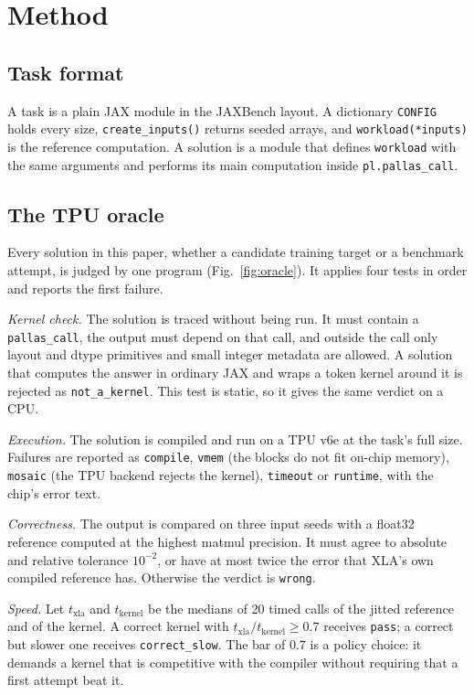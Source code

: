 \documentclass[conference]{IEEEtran}
\begin{document}
\section{Method}

\subsection{Task format}

A task is a plain JAX module in the JAXBench layout. A dictionary \texttt{CONFIG} holds every size, \texttt{create\_inputs()}
returns seeded arrays, and \texttt{workload(*inputs)} is the reference computation. A solution is a module that defines
\texttt{workload} with the same arguments and performs its main computation inside \texttt{pl.pallas\_call}.

\subsection{The TPU oracle}
\label{sec:oracle}

Every solution in this paper, whether a candidate training target or a benchmark attempt, is judged by one program
(Fig.~\ref{fig:oracle}). It applies four tests in order and reports the first failure.

\emph{Kernel check.} The solution is traced without being run. It must contain a \texttt{pallas\_call}, the output must depend
on that call, and outside the call only layout and dtype primitives and small integer metadata are allowed. A solution that
computes the answer in ordinary JAX and wraps a token kernel around it is rejected as \texttt{not\_a\_kernel}. This test is
static, so it gives the same verdict on a CPU.

\emph{Execution.} The solution is compiled and run on a TPU v6e at the task's full size. Failures are reported as
\texttt{compile}, \texttt{vmem} (the blocks do not fit on-chip memory), \texttt{mosaic} (the TPU backend rejects the kernel),
\texttt{timeout} or \texttt{runtime}, with the chip's error text.

\emph{Correctness.} The output is compared on three input seeds with a float32 reference computed at the highest matmul
precision. It must agree to absolute and relative tolerance $10^{-2}$, or have at most twice the error that XLA's own compiled
reference has. Otherwise the verdict is \texttt{wrong}.

\emph{Speed.} Let $t_{\mathrm{xla}}$ and $t_{\mathrm{kernel}}$ be the medians of 20 timed calls of the jitted reference and of
the kernel. A correct kernel with $t_{\mathrm{xla}} / t_{\mathrm{kernel}} \ge 0.7$ receives \texttt{pass}; a correct but slower
one receives \texttt{correct\_slow}. The bar of 0.7 is a policy choice: it demands a kernel that is competitive with the
compiler without requiring that a first attempt beat it.
\end{document}
